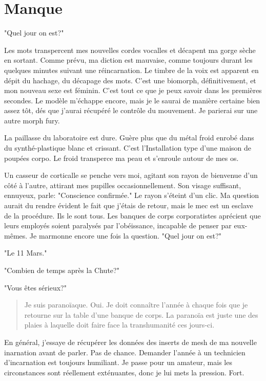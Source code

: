 \chapter{Manque} \label{chap:lack} 

"Quel jour on est?" 

Les mots transpercent mes nouvelles cordes vocalles et décapent ma gorge sèche en sortant. Comme prévu, ma diction est mauvaise, comme toujours durant les quelques minutes suivant une réincarnation. Le timbre de la voix est apparent en dépit du hachage, du décapage des mots. C'est une biomorph, définitivement, et mon nouveau sexe est féminin. C'est tout ce que je peux savoir dans les premières secondes. Le modèle m'échappe encore, mais je le saurai de manière certaine bien assez tôt, dés que j'aurai récupéré le contrôle du mouvement. Je parierai sur une autre morph fury. 

La paillasse du laboratoire est dure. Guère plus que du métal froid enrobé dans du synthé-plastique blanc et crissant. C'est l'Installation type d'une maison de poupées corpo. Le froid transperce ma peau et s'enroule autour de mes os. 

Un casseur de corticalle se penche vers moi, agitant son rayon de bienvenue d'un côté à l'autre, attirant mes pupilles occasionnellement. Son visage suffisant, ennuyeux, parle: "Conscience confirmée." Le rayon s'éteint d'un clic. Ma question aurait du rendre évident le fait que j'étais de retour, mais le mec est un esclave de la procédure. Ils le sont tous. Les banques de corps corporatistes aprécient que leurs employés soient paralysés par l'obéissance, incapable de penser par eux-mêmes. Je marmonne encore une fois la question. "Quel jour on est?" 

"Le 11 Mars." 

"Combien de temps après la Chute?" 

"Vous êtes sérieux?" 

\begin{quotation} Je suis paranoïaque. Oui. Je doit connaître l'année à chaque fois que je retourne sur la table d'une banque de corps. La paranoïa est juste une des plaies à laquelle doit faire face la transhumanité ces jours-ci. \end{quotation} 

En général, j'essaye de récupérer les données des inserts de mesh de ma nouvelle inarnation avant de parler. Pas de chance. Demander l'année à un technicien d'incarnation est toujours humiliant. Je passe pour un amateur, mais les circonstances sont réellement exténuantes, donc je lui mets la pression. Fort. 

